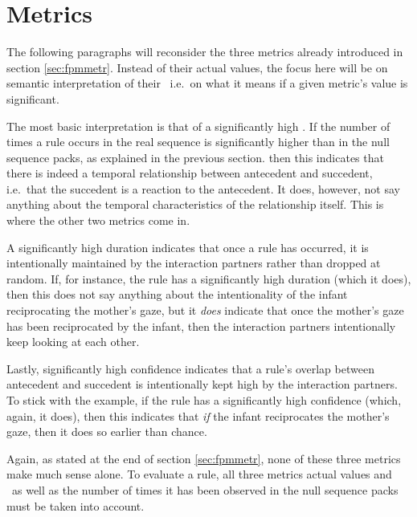 \section{Metrics}
\label{sec:sigmetr}
The following paragraphs will reconsider the three metrics already introduced in section \ref{sec:fpmmetr}.
Instead of their actual values, the focus here will be on semantic interpretation of their \pv\, i.e.~on what it means if a given metric's value is significant.

The most basic interpretation is that of a significantly high \noc.
If the number of times a rule occurs in the real sequence is significantly higher than in the null sequence packs, as explained in the previous section. then this indicates that there is indeed a temporal relationship between antecedent and succedent, i.e.~that the succedent is a reaction to the antecedent.
It does, however, not say anything about the temporal characteristics of the relationship itself.
This is where the other two metrics come in.

A significantly high duration indicates that once a rule has occurred, it is intentionally maintained by the interaction partners rather than dropped at random.
If, for instance, the rule \fpmtextrule{\mogain}{\ingamo} has a significantly high duration (which it does), then this does not say anything about the intentionality of the infant reciprocating the mother's gaze, but it \emph{does} indicate that once the mother's gaze has been reciprocated by the infant, then the interaction partners intentionally keep looking at each other.

Lastly, significantly high confidence indicates that a rule's overlap between antecedent and succedent is intentionally kept high by the interaction partners.
To stick with the example, if the rule \fpmtextrule{\mogain}{\ingamo} has a significantly high confidence (which, again, it does), then this indicates that \emph{if} the infant reciprocates the mother's gaze, then it does so earlier than chance.

Again, as stated at the end of section \ref{sec:fpmmetr}, none of these three metrics make much sense alone.
To evaluate a rule, all three metrics actual values and \pv\ as well as the number of times it has been observed in the null sequence packs must be taken into account.


